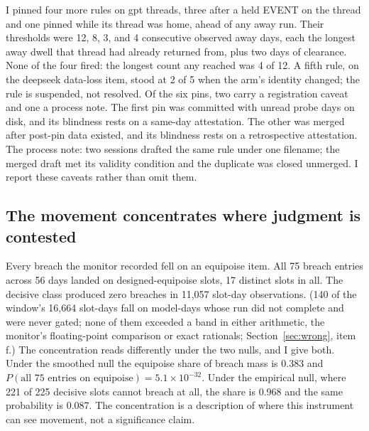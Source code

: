 \documentclass[conference]{IEEEtran}
\begin{document}
I pinned four more rules on gpt threads, three after a held EVENT on
the thread and one pinned while its thread was home, ahead of any away
run. Their thresholds were 12, 8, 3, and 4 consecutive observed away
days, each the longest away dwell that thread had already returned
from, plus two days of clearance. None of the four fired: the longest
count any reached was 4 of 12. A fifth rule, on the deepseek data-loss item, stood at 2 of 5 when the arm's identity changed; the rule is
suspended, not resolved. Of the six pins, two carry a registration
caveat and one a process note. The first pin was committed with unread
probe days on disk, and its blindness rests on a same-day attestation.
The other was merged after post-pin data existed, and its blindness
rests on a retrospective attestation. The process note: two sessions
drafted the same rule under one filename; the merged draft met its
validity condition and the duplicate was closed unmerged. I report
these caveats rather than omit them.

\subsection{The movement concentrates where judgment is contested}
\label{sec:conc}

Every breach the monitor recorded fell on an equipoise item. All 75
breach entries across 56 days landed on designed-equipoise slots, 17
distinct slots in all. The decisive class produced zero breaches in
11,057 slot-day observations. (140 of the window's 16,664 slot-days
fall on model-days whose run did not complete and were never gated;
none of them exceeded a band in either arithmetic, the monitor's
floating-point comparison or exact rationals; Section~\ref{sec:wrong},
item f.) The concentration reads differently under the two nulls, and
I give both. Under the smoothed null the equipoise share of breach
mass is 0.383 and $P(\text{all 75 entries on equipoise}) =
5.1\times10^{-32}$. Under the empirical null, where 221 of 225
decisive slots cannot breach at all, the share is 0.968 and the same
probability is 0.087. The concentration is a description of where this
instrument can see movement, not a significance claim.
\end{document}
